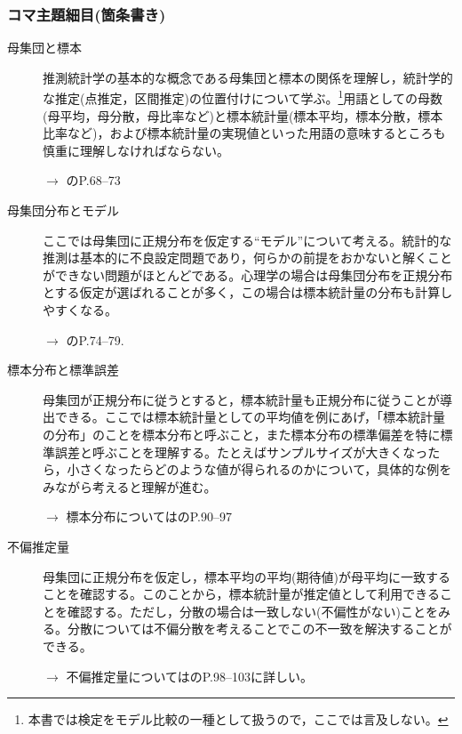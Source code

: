 \subsubsection{コマ主題細目(箇条書き)}
\begin{description}
\item[母集団と標本]推測統計学の基本的な概念である母集団と標本の関係を理解し，統計学的な推定(点推定，区間推定)の位置付けについて学ぶ。\footnote{本書では検定をモデル比較の一種として扱うので，ここでは言及しない。}用語としての母数(母平均，母分散，母比率など)と標本統計量(標本平均，標本分散，標本比率など)，および標本統計量の実現値といった用語の意味するところも慎重に理解しなければならない。
    \begin{flushright}
        $\to$ \citet{Yamada2004}のP.68--73
    \end{flushright}

\item[母集団分布とモデル]ここでは母集団に正規分布を仮定する``モデル''について考える。統計的な推測は基本的に不良設定問題であり，何らかの前提をおかないと解くことができない問題がほとんどである。心理学の場合は母集団分布を正規分布とする仮定が選ばれることが多く，この場合は標本統計量の分布も計算しやすくなる。
\begin{flushright}
    $\to$ \citet{Yamada2004}のP.74--79.
\end{flushright}

\item[標本分布と標準誤差]母集団が正規分布に従うとすると，標本統計量も正規分布に従うことが導出できる。ここでは標本統計量としての平均値を例にあげ，「標本統計量の分布」のことを標本分布と呼ぶこと，また標本分布の標準偏差を特に標準誤差と呼ぶことを理解する。たとえばサンプルサイズが大きくなったら，小さくなったらどのような値が得られるのかについて，具体的な例をみながら考えると理解が進む。
\begin{flushright}
    $\to$ 標本分布については\citet{Yamada2004}のP.90--97
\end{flushright}

\item[不偏推定量]母集団に正規分布を仮定し，標本平均の平均(期待値)が母平均に一致することを確認する。このことから，標本統計量が推定値として利用できることを確認する。ただし，分散の場合は一致しない(不偏性がない)ことをみる。分散については不偏分散を考えることでこの不一致を解決することができる。
\begin{flushright}
    $\to$ 不偏推定量については\citet{Yamada2004}のP.98--103に詳しい。
\end{flushright}

\end{description}
